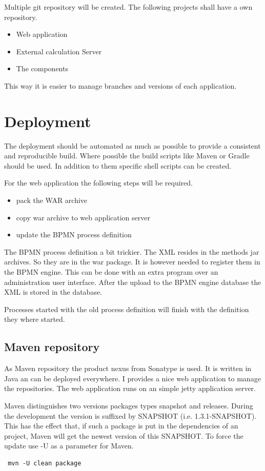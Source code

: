 \documentclass[paper=a4,twoside=false,BCOR=0mm,DIV=calc,fontsize=12pt]{scrartcl}
\begin{document}
Multiple git repository will be created. The following projects shall have a own repository.
\begin{itemize}
 \item Web application
 \item External calculation Server
 \item The components
\end{itemize}

This way it is easier to manage branches and versions of each application.



\section{Deployment}
The deployment should be automated as much as possible to provide a consistent and reproducible build.
Where possible the build scripts like Maven or Gradle should be used. 
In addition to them specific shell scripts can be created.

For the web application the following steps will be required.
\begin{itemize}
 \item pack the WAR archive
 \item copy war archive to web application server
 \item update the BPMN process definition
\end{itemize}

The BPMN process definition a bit trickier. The XML resides in the methods jar archives. So they are in the war package. It is however needed to register them in the BPMN engine. 
This can be done with an extra program over an administration user interface. After the upload to the BPMN engine database the XML is stored in the database.

Processes started with the old process definition will finish with the definition they where started.



\subsection{Maven repository}
As Maven repository the product nexus \cite{nexus} from Sonatype is used. It is written in Java an can be deployed everywhere. I provides a nice web application to manage the repositories. The web application runs on an simple jetty \cite{jetty} application server.

Maven distinguishes two versions packages types snapshot and releases.
During the development the version is suffixed by SNAPSHOT (i.e. 1.3.1-SNAPSHOT).
This has the effect that, if such a package is put in the dependencies of an project, Maven will get the newest version of this SNAPSHOT. To force the update use -U as a parameter for Maven.
\begin{verbatim}
 mvn -U clean package
\end{verbatim}
\end{document}
